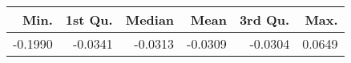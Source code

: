 \begin{table}[ht]
\centering
\begin{tabular}{rrrrrr}
  \hline
Min. & 1st Qu. & Median & Mean & 3rd Qu. & Max. \\ 
  \hline
-0.1990 & -0.0341 & -0.0313 & -0.0309 & -0.0304 & 0.0649 \\ 
   \hline
\end{tabular}
\end{table}
